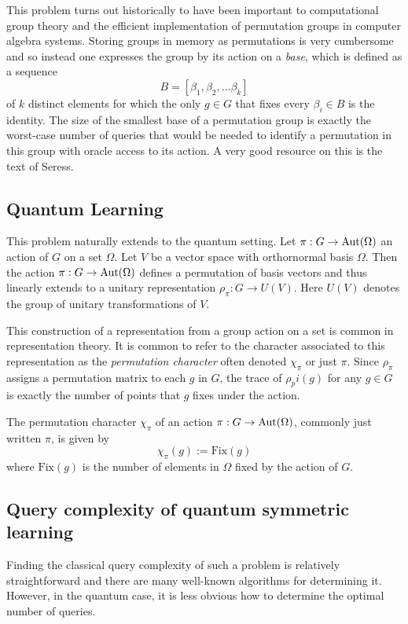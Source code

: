 \bigskip

This problem turns out historically to have been important to computational group theory and the efficient 
implementation of permutation groups in computer algebra systems. Storing groups in memory as permutations is very 
cumbersome and so instead one expresses the group by its action on a \emph{base}, which is defined as a sequence
\[
    B = [\beta_1, \beta_2, ... \beta_k]
\]
of $k$ distinct elements for which the only $g\in G$ that fixes every $\beta_i \in B$ is the identity. The size of 
the smallest base of a permutation group is exactly the worst-case number of queries that would be needed to 
identify a permutation in this group with oracle access to its action. A very good resource on this is the text 
\cite{seress} of Seress. 


\subsection{Quantum Learning}

This problem naturally extends to the quantum setting. Let $\pi : G \rightarrow \operatorname{Aut}(\Omega)$ an action of $G$ on a 
set $\Omega$. Let $V$ be a vector space with orthornormal basis $\Omega$. Then the action $\pi : G \rightarrow 
\operatorname{Aut}(\Omega)$ defines a permutation of basis vectors and thus linearly extends to a unitary representation 
$\rho_\pi : G \rightarrow U(V)$. Here $U(V)$ denotes the group of unitary transformations of $V$.

This construction of a representation from a group action on a set is common in representation theory. It is common 
to refer to the character associated to this representation as the \emph{permutation character} often denoted 
$\chi_\pi$ or just $\pi$. Since $\rho_\pi$ assigns a permutation matrix to each $g$ in $G$, the trace of 
$\rho_pi(g)$ for any $g \in G$ is exactly the number of points that $g$ fixes under the action. 

\begin{definition}
    The permutation character $\chi_\pi$ of an action $\pi: G \rightarrow \operatorname{Aut}(\Omega)$, commonly just written 
    $\pi$, is given by
    \[
        \chi_\pi(g) := \text{Fix}(g)
    \]
    where $\text{Fix}(g)$ is the number of elements in $\Omega$ fixed by the action of $G$.
\end{definition}

\subsection{Query complexity of quantum symmetric learning}
Finding the classical query complexity of such a problem is relatively straightforward and there are many 
well-known algorithms for determining it. However, in the quantum case, it is less obvious how to determine the 
optimal number of queries.

